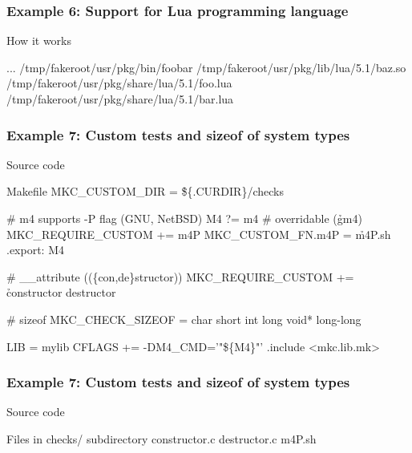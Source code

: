 \documentclass[hyperref={colorlinks=true}]{beamer}
\begin{document}
\begin{frame}[fragile]
  \frametitle{Example 6: Support for Lua programming language}

  \begin{block}{How it works}
  \begin{CodeNoLabel}
    ...
/tmp/fakeroot/usr/pkg/bin/foobar
/tmp/fakeroot/usr/pkg/lib/lua/5.1/baz.so
/tmp/fakeroot/usr/pkg/share/lua/5.1/foo.lua
/tmp/fakeroot/usr/pkg/share/lua/5.1/bar.lua
\prompt{\$}
  \end{CodeNoLabel}
  \end{block}
\end{frame}

\begin{frame}[fragile]
  \frametitle{Example 7: Custom tests and sizeof of system types}

\begin{block}{Source code}
\begin{Code}{Makefile}
MKC\_CUSTOM\_DIR      = \h{\$\{.CURDIR\}/checks}

# m4 supports -P flag (GNU, NetBSD)
M4                 ?= m4 # overridable (\h{gm4})
MKC\_REQUIRE\_CUSTOM += m4P
MKC\_CUSTOM\_FN.m4P   = \h{m4P.sh}
.export: M4

# \_\_attribute ((\{con,de\}structor))
MKC\_REQUIRE\_CUSTOM += \h{constructor destructor}

# sizeof
MKC\_CHECK\_SIZEOF    = char short int long void* long-long

LIB                 = mylib
CFLAGS             += -DM4\_CMD='"\$\{M4\}"'
.include <mkc.lib.mk>
\end{Code}
\end{block}
\end{frame}

\begin{frame}[fragile]
  \frametitle{Example 7: Custom tests and sizeof of system types}

\begin{block}{Source code}
\begin{Code}{Files in checks/ subdirectory}
constructor.c
destructor.c
m4P.sh
\prompt{\$}
\end{Code}
\end{block}
\end{frame}
\end{document}

